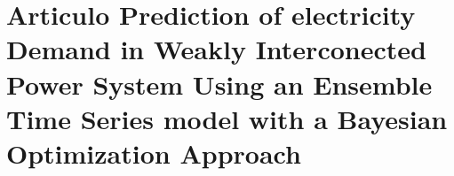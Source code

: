 \section{Articulo Prediction of electricity Demand in Weakly Interconected Power System Using an Ensemble Time Series model with a Bayesian Optimization Approach}

